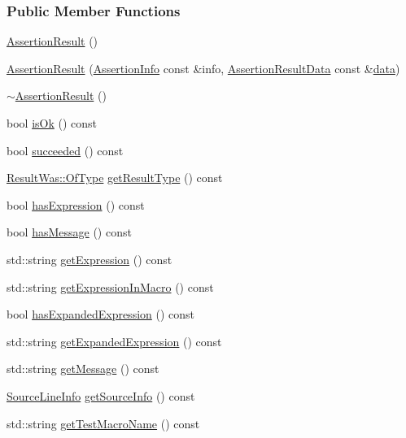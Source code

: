 \subsubsection*{Public Member Functions}
\begin{DoxyCompactItemize}
\item 
\hyperlink{a00005_a570b999c5f66e33cb31d3adb29fec25b}{Assertion\+Result} ()
\item 
\hyperlink{a00005_ab58aeec27052ba400633ed0e36cea692}{Assertion\+Result} (\hyperlink{a00004}{Assertion\+Info} const \&info, \hyperlink{a00006}{Assertion\+Result\+Data} const \&\hyperlink{a00114_a32d7eebae6f15ceb9cc7f573d7dbd27d}{data})
\item 
\hyperlink{a00005_abf90f5abd04d38b2fb4f5d575bdc4f1e}{$\sim$\+Assertion\+Result} ()
\item 
bool \hyperlink{a00005_a70fb6aa62a38db3bdcafb4bb134afb21}{is\+Ok} () const 
\item 
bool \hyperlink{a00005_a5404062147930354afeb154de7cbaa7e}{succeeded} () const 
\item 
\hyperlink{a00069_a624e1ee3661fcf6094ceef1f654601ef}{Result\+Was\+::\+Of\+Type} \hyperlink{a00005_aa90bec8064879a62fcdc8e1079bcdba1}{get\+Result\+Type} () const 
\item 
bool \hyperlink{a00005_a45551f4f092c640ffce0cdd8a94f4b62}{has\+Expression} () const 
\item 
bool \hyperlink{a00005_ab22a1c9baa182aeb2549fffeb8294d9e}{has\+Message} () const 
\item 
std\+::string \hyperlink{a00005_a6105300b90d66b5c11b69813f83d074d}{get\+Expression} () const 
\item 
std\+::string \hyperlink{a00005_ac368a7490af7669decd58efea7d7dc54}{get\+Expression\+In\+Macro} () const 
\item 
bool \hyperlink{a00005_a122c369bd49430a304e3eaebdf184f36}{has\+Expanded\+Expression} () const 
\item 
std\+::string \hyperlink{a00005_a675d074588875eb62b0b6e36e05d65e6}{get\+Expanded\+Expression} () const 
\item 
std\+::string \hyperlink{a00005_a9793bfc4d24678c8a013bda84a5aa905}{get\+Message} () const 
\item 
\hyperlink{a00075}{Source\+Line\+Info} \hyperlink{a00005_a68b73fe982a97fe6432af679af1a2dad}{get\+Source\+Info} () const 
\item 
std\+::string \hyperlink{a00005_a2901d41b199258ff6a44571b147169dd}{get\+Test\+Macro\+Name} () const 
\end{DoxyCompactItemize}
